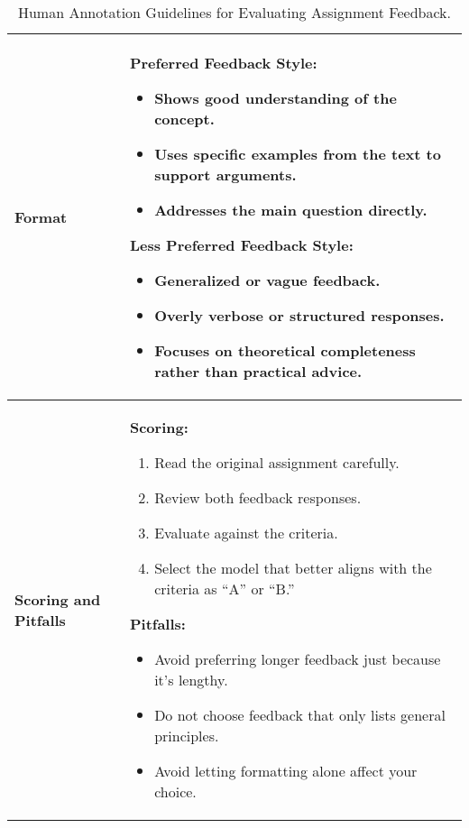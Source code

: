 \begin{table*}[t]
\begin{tabularx}{\textwidth}{|p{3cm}|X|}
\textbf{Format} & 
\textbf{Preferred Feedback Style:}
\begin{itemize}
    \item Shows good understanding of the concept.
    \item Uses specific examples from the text to support arguments.
    \item Addresses the main question directly.
\end{itemize}
\textbf{Less Preferred Feedback Style:}
\begin{itemize}
    \item Generalized or vague feedback.
    \item Overly verbose or structured responses.
    \item Focuses on theoretical completeness rather than practical advice.
\end{itemize}
\\ \hline

\textbf{Scoring and Pitfalls} & 
\textbf{Scoring:}
\begin{enumerate}
    \item Read the original assignment carefully.
    \item Review both feedback responses.
    \item Evaluate against the criteria.
    \item Select the model that better aligns with the criteria as ``A'' or ``B.''
\end{enumerate}
\textbf{Pitfalls:}
\begin{itemize}
    \item Avoid preferring longer feedback just because it’s lengthy.
    \item Do not choose feedback that only lists general principles.
    \item Avoid letting formatting alone affect your choice.
\end{itemize}
\\ \hline
\end{tabularx}
\caption{Human Annotation Guidelines for Evaluating Assignment Feedback.}
\label{tab:annotation_guidelines}
\end{table*}
